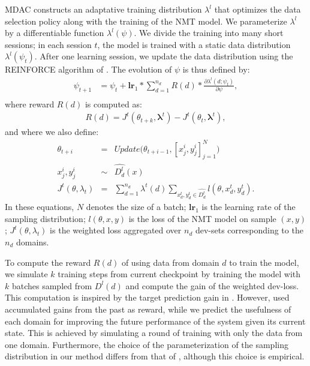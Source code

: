 \documentclass[11pt]{article}
\newcommand{\vlambda}{\ensuremath{\boldsymbol\lambda}\xspace} %
\begin{document}
MDAC constructs an adaptative training distribution $\lambda^{l}$ that optimizes the data selection policy along with the training of the NMT model. We parameterize $\lambda^{l}$ by a differentiable function $\lambda^l(\psi)$. We divide the training into many short sessions; in each session $t$, the model is trained with a static data distribution $\lambda^{l}(\psi_t)$. After one learning session, we update the data distribution using the REINFORCE algorithm of \citet{Williams92simple}. The evolution of $\psi$ is thus defined by:
\begin{align*}
\psi_{t+1} &= \psi_t + \mathbf{lr}_{1} * \displaystyle{\mathop{\sum}_{d=1}^{n_d}} R(d) * \frac{\partial \lambda^l(d;\psi_t)}{\partial \psi}, \\
\end{align*}
\begingroup
\allowdisplaybreaks
where reward $R(d)$ is computed as:
\begin{align*}
  R(d) = J^t(\theta_{t+k},\vlambda^t) - J^t(\theta_t,\vlambda^t),
\end{align*}
and where we also define:
\begin{equation}
\begin{array}{rcl}
\theta_{t+i} &=& Update\big(\theta_{t+i-1},[x^i_j,y^i_j]_{j=1}^N\big) \\ \nonumber
x^i_j, y^i_j &\sim& \widehat{D^l_d}(x) \\
J^t(\theta,\lambda_t) &=& \displaystyle{\mathop{\sum}_{d=1}^{n_d}}\lambda^t(d)\displaystyle{\mathop{\sum}_{x^t_d,y^t_d \in \widehat{D^t_d}}} l(\theta,x^t_d,y^t_d).
\end{array}
\end{equation}
\endgroup
In these equations, $N$ denotes the size of a batch; $\mathbf{lr}_{1}$ is the learning rate of the sampling distribution; $l(\theta,x,y)$ is the loss of the NMT model on sample $(x,y)$; $J^t(\theta,\lambda_t)$ is the weighted loss aggregated over $n_d$ dev-sets corresponding to the $n_d$ domains.

To compute the reward $R(d)$ of using data from domain $d$ to train the model, we simulate $k$ training steps from current checkpoint by training the model with $k$ batches sampled from $D^l(d)$ and compute the gain of the weighted dev-loss. This computation is inspired by the target prediction gain in \citep{Graves17automated}. However, \cite{Graves17automated} used accumulated gains from the past as reward, while we predict the usefulness of each domain for improving the future performance of the system given its current state. This is achieved by simulating a round of training with only the data from one domain. Furthermore, the choice of the parameterization of the sampling distribution in our method differs from that of \citet{Graves17automated}, although this choice is empirical.
\end{document}
